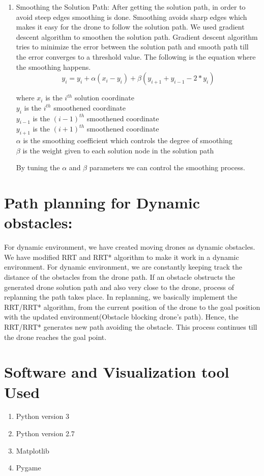 \documentclass{IEEEtran}
\begin{document}
\begin{enumerate}
\item {Smoothing the Solution Path:}
After getting the solution path, in order to avoid steep edges smoothing is done. Smoothing avoids sharp edges which makes it easy for the drone to follow the solution path. We used gradient descent algorithm to smoothen the solution path. Gradient descent algorithm tries to minimize the error between the solution path and smooth path till the error converges to a threshold value. The following is the equation where the smoothing happens.
\boldmath	
\begin{equation}
y_i = y_i + \alpha(x_i - y_i) + \beta(y_{i+1} + y_{i-1} - 2*y_i)
\end{equation}
\unboldmath
\begin{center}
where $x_i$ is the $i^{th}$ solution coordinate \\
        $y_i$ is the  $i^{th}$ smoothened coordinate \\
	$y_{i-1}$ is the  $(i-1)^{th}$ smoothened coordinate \\
	$y_{i+1}$ is the  $(i+1)^{th}$ smoothened coordinate \\
	$\alpha$ is the smoothing coefficient which controls the degree of smoothing \\
	$\beta$ is the weight given to each solution node in the solution path \\
\end{center}
By tuning the $\alpha$ and $\beta$ parameters we can control the smoothing process.
\end{enumerate}
\section{ \textbf{Path planning for Dynamic obstacles:}}
For dynamic environment, we have created moving drones as dynamic obstacles. We have modified RRT and RRT* algorithm to make it work in a dynamic environment. For dynamic environment, we are constantly keeping track the distance of the obstacles from the drone path. If an obstacle obstructs the generated drone solution path and also very close to the drone, process of replanning the path takes place. In replanning, we basically implement the RRT/RRT* algorithm, from the current position of the drone to the goal position with the updated environment(Obstacle blocking drone's path). Hence, the RRT/RRT* generates new path avoiding the obstacle. This process continues till the drone reaches the goal point.
\section{\textbf{Software and Visualization tool Used}}
\begin{enumerate}
\item Python version 3
\item Python version 2.7
\item Matplotlib
\item Pygame
\end{enumerate}
\end{document}
